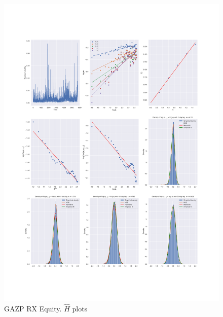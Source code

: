 \begin{figure}[h]
    \centering
    \includegraphics[width=\linewidth]{fig/GAZP RX Equity.pdf}
    \caption{GAZP RX Equity. $\hat{H}$ plots}
\end{figure} 
    
